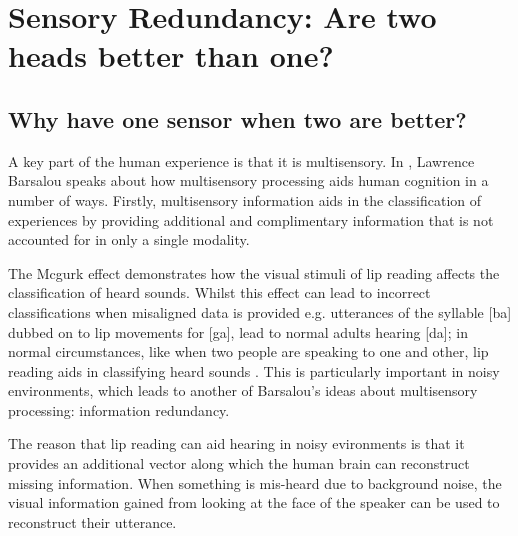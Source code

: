 
\chapter{Sensory Redundancy: Are two heads better than one?} %

\label{Chapter4} %



\section{Why have one sensor when two are better?}
A key part of the human experience is that it is multisensory. In \cite{barsalou2008grounded}, Lawrence Barsalou speaks about how multisensory processing aids human cognition in a number of ways. Firstly, multisensory information aids in the classification of experiences by providing additional and complimentary information that is not accounted for in only a single modality. 

The Mcgurk effect \cite{mcgurk1976hearing} demonstrates how the visual stimuli of lip reading affects the classification of heard sounds. Whilst this effect can lead to incorrect classifications when misaligned data is provided e.g. utterances of the syllable [ba] dubbed on to lip movements for [ga], lead to normal adults hearing [da]; in normal circumstances, like when two people are speaking to one and other, lip reading aids in classifying heard sounds \cite{ma2009lip}. This is particularly important in noisy environments, which leads to another of Barsalou's ideas about multisensory processing: information redundancy.

The reason that lip reading can aid hearing in noisy evironments is that it provides an additional vector along which the human brain can reconstruct missing information. When something is mis-heard due to background noise, the visual information gained from looking at the face of the speaker can be used to reconstruct their utterance.


